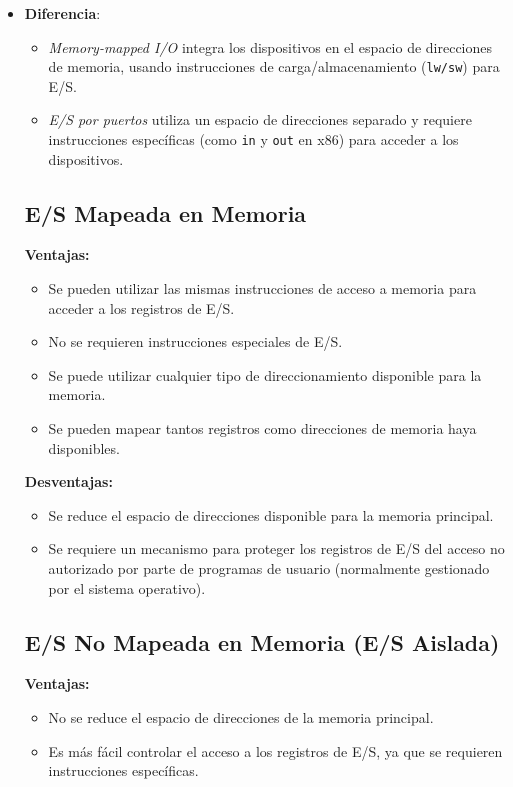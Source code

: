 \documentclass{article}
\begin{document}
\begin{itemize}
    \item \textbf{Diferencia}:
    \begin{itemize}
        \item \textit{Memory-mapped I/O} integra los dispositivos en el espacio de direcciones de memoria, usando instrucciones de carga/almacenamiento (\texttt{lw/sw}) para E/S.
        \item \textit{E/S por puertos} utiliza un espacio de direcciones separado y requiere instrucciones específicas (como \texttt{in} y \texttt{out} en x86) para acceder a los dispositivos.
    \end{itemize}
    
    
\subsection*{E/S Mapeada en Memoria}

\textbf{Ventajas:}
\begin{itemize}
    \item Se pueden utilizar las mismas instrucciones de acceso a memoria para acceder a los registros de E/S.
    \item No se requieren instrucciones especiales de E/S.
    \item Se puede utilizar cualquier tipo de direccionamiento disponible para la memoria.
    \item Se pueden mapear tantos registros como direcciones de memoria haya disponibles.
\end{itemize}

\textbf{Desventajas:}
\begin{itemize}
    \item Se reduce el espacio de direcciones disponible para la memoria principal.
    \item Se requiere un mecanismo para proteger los registros de E/S del acceso no autorizado por parte de programas de usuario (normalmente gestionado por el sistema operativo).
\end{itemize}

\subsection*{E/S No Mapeada en Memoria (E/S Aislada)}

\textbf{Ventajas:}
\begin{itemize}
    \item No se reduce el espacio de direcciones de la memoria principal.
    \item Es más fácil controlar el acceso a los registros de E/S, ya que se requieren instrucciones específicas.
\end{itemize}


\end{itemize}
\end{document}
